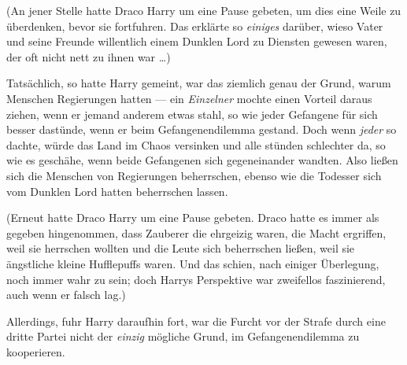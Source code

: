 (An jener Stelle hatte Draco Harry um eine Pause gebeten, um dies eine Weile zu überdenken, bevor sie fortfuhren. Das erklärte so \emph{einiges} darüber, wieso Vater und seine Freunde willentlich einem Dunklen Lord zu Diensten gewesen waren, der oft nicht nett zu ihnen war …)

Tatsächlich, so hatte Harry gemeint, war das ziemlich genau der Grund, warum Menschen Regierungen hatten — ein \emph{Einzelner} mochte einen Vorteil daraus ziehen, wenn er jemand anderem etwas stahl, so wie jeder Gefangene für sich besser dastünde, wenn er beim Gefangenendilemma gestand. Doch wenn \emph{jeder} so dachte, würde das Land im Chaos versinken und alle stünden schlechter da, so wie es geschähe, wenn beide Gefangenen sich gegeneinander wandten. Also ließen sich die Menschen von Regierungen beherrschen, ebenso wie die Todesser sich vom Dunklen Lord hatten beherrschen lassen.

(Erneut hatte Draco Harry um eine Pause gebeten. Draco hatte es immer als gegeben hingenommen, dass Zauberer die ehrgeizig waren, die Macht ergriffen, weil sie herrschen wollten und die Leute sich beherrschen ließen, weil sie ängstliche kleine Hufflepuffs waren. Und das schien, nach einiger Überlegung, noch immer wahr zu sein; doch Harrys Perspektive war zweifellos faszinierend, auch wenn er falsch lag.)

Allerdings, fuhr Harry daraufhin fort, war die Furcht vor der Strafe durch eine dritte Partei nicht der \emph{einzig} mögliche Grund, im Gefangenendilemma zu kooperieren.

